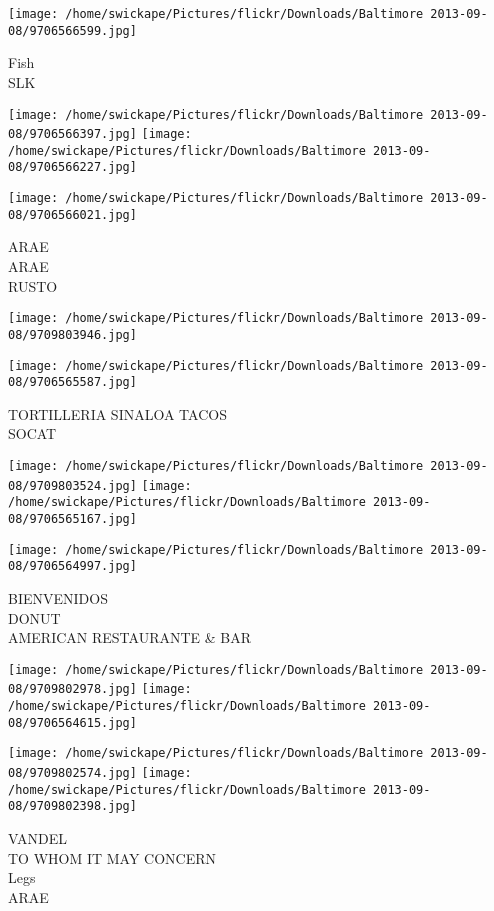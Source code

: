\documentclass[10pt,letterpaper]{article}
\begin{document}
\vspace{0.25in}
\texttt{[image: /home/swickape/Pictures/flickr/Downloads/Baltimore 2013-09-08/9706566599.jpg]}

Fish\\
SLK
\pagebreak

\texttt{[image: /home/swickape/Pictures/flickr/Downloads/Baltimore 2013-09-08/9706566397.jpg]}
\texttt{[image: /home/swickape/Pictures/flickr/Downloads/Baltimore 2013-09-08/9706566227.jpg]}

\texttt{[image: /home/swickape/Pictures/flickr/Downloads/Baltimore 2013-09-08/9706566021.jpg]}

ARAE\\
ARAE\\
RUSTO
\pagebreak

\texttt{[image: /home/swickape/Pictures/flickr/Downloads/Baltimore 2013-09-08/9709803946.jpg]}

\vspace{0.25in}
\texttt{[image: /home/swickape/Pictures/flickr/Downloads/Baltimore 2013-09-08/9706565587.jpg]}

TORTILLERIA SINALOA TACOS\\
SOCAT
\pagebreak

\texttt{[image: /home/swickape/Pictures/flickr/Downloads/Baltimore 2013-09-08/9709803524.jpg]}
\texttt{[image: /home/swickape/Pictures/flickr/Downloads/Baltimore 2013-09-08/9706565167.jpg]}

\vspace{0.25in}
\texttt{[image: /home/swickape/Pictures/flickr/Downloads/Baltimore 2013-09-08/9706564997.jpg]}

BIENVENIDOS\\
DONUT\\
AMERICAN RESTAURANTE \& BAR
\pagebreak

\texttt{[image: /home/swickape/Pictures/flickr/Downloads/Baltimore 2013-09-08/9709802978.jpg]}
\texttt{[image: /home/swickape/Pictures/flickr/Downloads/Baltimore 2013-09-08/9706564615.jpg]}

\texttt{[image: /home/swickape/Pictures/flickr/Downloads/Baltimore 2013-09-08/9709802574.jpg]}
\texttt{[image: /home/swickape/Pictures/flickr/Downloads/Baltimore 2013-09-08/9709802398.jpg]}

VANDEL\\
TO WHOM IT MAY CONCERN\\
Legs\\
ARAE
\pagebreak
\end{document}
